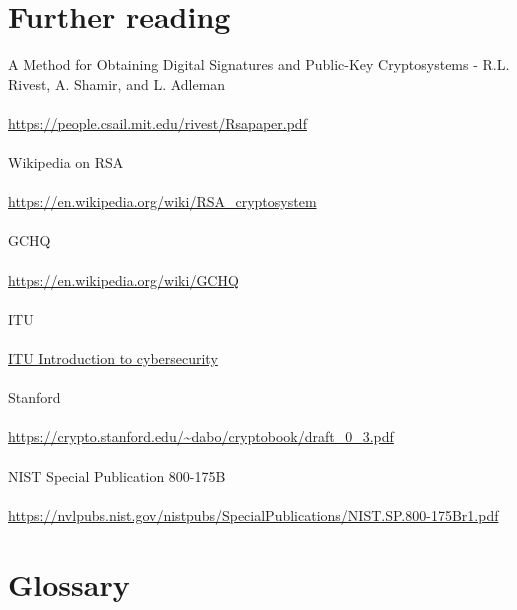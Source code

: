 \documentclass[11pt]{article}   	%
\begin{document}
\section*{Further reading}

A Method for Obtaining Digital Signatures and Public-Key Cryptosystems - R.L. Rivest, A. Shamir, and L. Adleman \\
\\
\url{https://people.csail.mit.edu/rivest/Rsapaper.pdf} \\
\\
Wikipedia on RSA \\
\\
\url{https://en.wikipedia.org/wiki/RSA_cryptosystem} \\
\\
GCHQ \\
\\
\url{https://en.wikipedia.org/wiki/GCHQ} \\
\\
ITU \\
\\
\href{https://www.itu.int/en/ITU-D/Cybersecurity/Documents/01-Introduction%20to%20Cryptography.pdf}{ITU Introduction to cybersecurity} \\
\\
Stanford \\
\\
\url{https://crypto.stanford.edu/~dabo/cryptobook/draft_0_3.pdf} \\
\\
NIST Special Publication 800-175B \\
\\
\url{https://nvlpubs.nist.gov/nistpubs/SpecialPublications/NIST.SP.800-175Br1.pdf}

\break


\section*{Glossary}
\end{document}

